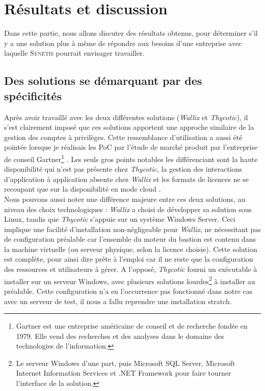 \section{Résultats et discussion}
\label{sec:resultats}

Dans cette partie, nous allons discuter des résultats obtenus, pour déterminer s'il y a une solution plus à même de répondre aux besoins d'une entreprise avec laquelle \textsc{Synetis} pourrait envisager travailler.

\subsection{Des solutions se démarquant par des spécificités}
\label{subsec:soltaille}

Après avoir travaillé avec les deux différentes solutions (\emph{Wallix} et \emph{Thycotic}), il s'est clairement imposé que ces solutions apportent une approche similaire de la gestion des comptes à privilèges. Cette ressemblance d'utilisation a aussi été pointée lorsque je réalisais les PoC par l'étude de marché produit par l'entreprise de conseil Gartner\footnote{Gartner est une entreprise américaine de conseil et de recherche fondée en 1979. Elle vend des recherches et des analyses dans le domaine des technologies de l'information.} \cite{gar}. Les seuls gros points notables les différenciant sont la haute disponibilité qui n'est pas présente chez \emph{Thycotic}, la gestion des interactions d'application à application absente chez \emph{Wallix} et les formats de licences ne se recoupant que sur la disponibilité en mode \og cloud \fg{}.\\
Nous pouvons aussi noter une différence majeure entre ces deux solutions, au niveau des choix technologiques : \emph{Wallix} a choisi de développer sa solution sous Linux, tandis que \emph{Thycotic} s'appuie sur un système Windows Server. Ceci implique une facilité d'installation non-négligeable pour \emph{Wallix}, ne nécessitant pas de configuration préalable car l'ensemble du moteur du bastion est contenu dans la machine virtuelle (ou serveur physique, selon la licence choisie). Cette solution est complète, pour ainsi dire \og prête à l'emploi \fg{} car il ne reste que la configuration des ressources et utilisateurs à gérer. A l'opposé, \emph{Thycotic} fourni un exécutable à installer sur un serveur Windows, avec plusieurs solutions lourdes\footnote{Le serveur Windows d'une part, puis Microsoft SQL Server, Microsoft Internet Information Services et .NET Framework pour faire tourner l'interface de la solution.} à installer au préalable. Cette configuration n'a en l'occurrence pas fonctionné dans notre cas avec un serveur de test, il nous a fallu reprendre une installation \gls{stratch}.\\
